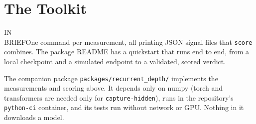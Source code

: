 \documentclass[11pt,letterpaper]{article}
\newcommand{\inbrief}[1]{\begin{inbriefbox}IN\\BRIEF\tcblower #1\end{inbriefbox}}
\newcommand{\cfg}[1]{\texttt{\small #1}}
\begin{document}
\section{The Toolkit}
\label{sec:toolkit}

\inbrief{One command per measurement, all printing JSON signal files that \cfg{score} combines. The package README has a quickstart that runs end to end, from a local checkpoint and a simulated endpoint to a validated, scored verdict.}

The companion package \texttt{packages/recurrent\_depth/} implements the measurements and scoring above. It depends only on numpy (torch and transformers are needed only for \cfg{capture-hidden}), runs in the repository's \texttt{python-ci} container, and its tests run without network or GPU. Nothing in it downloads a model.
\end{document}
